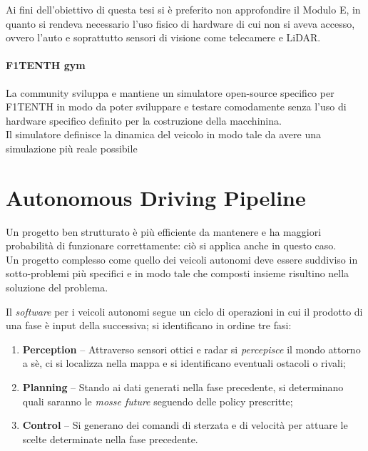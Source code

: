 \noindent Ai fini dell'obiettivo di questa tesi si è preferito non approfondire il Modulo E,
in quanto si rendeva necessario l'uso fisico di hardware di cui non si aveva accesso,
ovvero l'auto e soprattutto sensori di visione come telecamere e LiDAR.

\paragraph{F1TENTH gym}
\label{par:gym}
La community sviluppa e mantiene un simulatore open-source specifico per F1TENTH
in modo da poter sviluppare e testare comodamente
senza l'uso di hardware specifico definito per la costruzione della macchinina.\\
Il simulatore definisce la dinamica del veicolo in modo tale da avere una simulazione
più reale possibile %



\section{Autonomous Driving Pipeline}
\label{sec:pipeline}
Un progetto ben strutturato è più efficiente da mantenere e ha maggiori probabilità
di funzionare correttamente: ciò si applica anche in questo caso.\\
Un progetto complesso come quello dei veicoli autonomi deve essere suddiviso in sotto-problemi
più specifici e in modo tale che composti insieme risultino nella soluzione del problema.
\par

\noindent Il \emph{software} per i veicoli autonomi segue un ciclo di operazioni
in cui il prodotto di una fase è input della successiva; si identificano in ordine tre fasi:
\begin{enumerate}
\item \textbf{Perception} -- Attraverso sensori ottici e radar si \emph{percepisce} il mondo attorno a sè,
	  ci si localizza nella mappa e si identificano eventuali ostacoli o rivali;
\item \textbf{Planning} -- Stando ai dati generati nella fase precedente,
	  si determinano quali saranno le \emph{mosse future} seguendo delle policy prescritte;
\item \textbf{Control} -- Si generano dei comandi di sterzata e di velocità per attuare le scelte
	  determinate nella fase precedente.
\end{enumerate}

